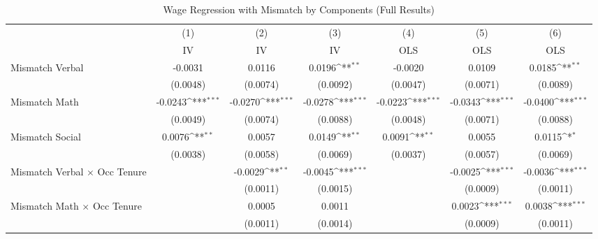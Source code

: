 {
\def\sym#1{\ifmmode^{#1}\else\(^{#1}\)\fi}
\begin{longtable}{l*{6}{c}}
\caption{Wage Regression with Mismatch by Components (Full Results)}\\
\hline  \endfirsthead\hline  \endhead\hline  \endfoot\endlastfoot
                    &\multicolumn{1}{c}{(1)}&\multicolumn{1}{c}{(2)}&\multicolumn{1}{c}{(3)}&\multicolumn{1}{c}{(4)}&\multicolumn{1}{c}{(5)}&\multicolumn{1}{c}{(6)}\\
                    &\multicolumn{1}{c}{IV}&\multicolumn{1}{c}{IV}&\multicolumn{1}{c}{IV}&\multicolumn{1}{c}{OLS}&\multicolumn{1}{c}{OLS}&\multicolumn{1}{c}{OLS}\\
\hline  
Mismatch Verbal     &     -0.0031         &      0.0116         &      0.0196\sym{**} &     -0.0020         &      0.0109         &      0.0185\sym{**} \\
                    &    (0.0048)         &    (0.0074)         &    (0.0092)         &    (0.0047)         &    (0.0071)         &    (0.0089)         \\
Mismatch Math       &     -0.0243\sym{***}&     -0.0270\sym{***}&     -0.0278\sym{***}&     -0.0223\sym{***}&     -0.0343\sym{***}&     -0.0400\sym{***}\\
                    &    (0.0049)         &    (0.0074)         &    (0.0088)         &    (0.0048)         &    (0.0071)         &    (0.0088)         \\
Mismatch Social     &      0.0076\sym{**} &      0.0057         &      0.0149\sym{**} &      0.0091\sym{**} &      0.0055         &      0.0115\sym{*}  \\
                    &    (0.0038)         &    (0.0058)         &    (0.0069)         &    (0.0037)         &    (0.0057)         &    (0.0069)         \\
Mismatch Verbal $\times$ Occ Tenure&                     &     -0.0029\sym{**} &     -0.0045\sym{***}&                     &     -0.0025\sym{***}&     -0.0036\sym{***}\\
                    &                     &    (0.0011)         &    (0.0015)         &                     &    (0.0009)         &    (0.0011)         \\
Mismatch Math $\times$ Occ Tenure&                     &      0.0005         &      0.0011         &                     &      0.0023\sym{***}&      0.0038\sym{***}\\
                    &                     &    (0.0011)         &    (0.0014)         &                     &    (0.0009)         &    (0.0011)         \\

\end{longtable}}
